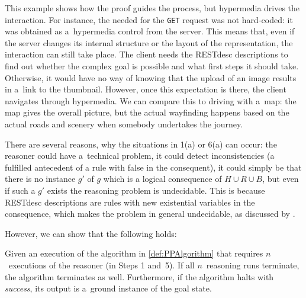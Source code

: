\noindent
This example shows how the proof guides the process,
but hypermedia drives the interaction.
For instance, the \URL needed for the \verb!GET! request was not hard-coded:
it was obtained as a~hypermedia control from the server.
This means that, even if the server changes its internal \URL structure
or the layout of the representation,
the interaction can still take place.
The client needs the RESTdesc descriptions to find out whether the complex goal is possible
and what first steps it should take.
Otherwise, it would have no way of knowing
that the upload of an image results in a~link to the thumbnail.
However, once this expectation is there,
the client navigates through hypermedia.
We can compare this to driving with a~map:
the map gives the overall picture,
but the actual wayfinding happens based on the actual roads and scenery
when somebody undertakes the journey.

There are several reasons, why the situations in 1(a) or 6(a) can occur:
the reasoner could have a~technical problem, it could detect inconsistencies
(a fulfilled antecedent of a rule with false in the consequent), it could simply be that 
there is no instance $g'$ of $g$ which is a logical consequence of $H \cup R\cup B$, but even
if such a $g'$ exists the reasoning problem is undecidable.
This is because RESTdesc descriptions are rules with new existential variables in the consequence,
which makes the problem in general undecidable, as discussed by \cite{Baget}.

However, we can show that the following holds:
\begin{theorem}
Given an execution of the algorithm in \cref{def:PPAlgorithm}
that requires $n$~executions of the reasoner (in Steps 1 and~5).
If all $n$~reasoning runs terminate, the algorithm terminates as well.
Furthermore, if the algorithm halts with \emph{success},
its output is a~ground instance of the goal state.

\end{theorem}

